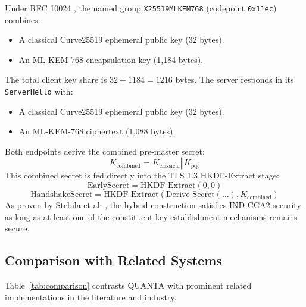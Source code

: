 \documentclass[conference]{IEEEtran}
\begin{document}
Under RFC 10024 \cite{rfc10024}, the named group \texttt{X25519MLKEM768} (codepoint \texttt{0x11ec}) combines:
\begin{itemize}
    \item A classical Curve25519 ephemeral public key (32 bytes).
    \item An ML-KEM-768 encapsulation key (1,184 bytes).
\end{itemize}
The total client key share is $32 + 1184 = 1216$ bytes. The server responds in its \texttt{ServerHello} with:
\begin{itemize}
    \item A classical Curve25519 ephemeral public key (32 bytes).
    \item An ML-KEM-768 ciphertext (1,088 bytes).
\end{itemize}
Both endpoints derive the combined pre-master secret:
\begin{equation}
    K_{\text{combined}} = K_{\text{classical}} \mathbin{\Vert} K_{\text{pqc}}
\end{equation}
This combined secret is fed directly into the TLS 1.3 HKDF-Extract stage:
\begin{equation}
    \text{EarlySecret} = \text{HKDF-Extract}(0, 0)
\end{equation}
\begin{equation}
    \text{HandshakeSecret} = \text{HKDF-Extract}(\text{Derive-Secret}(\dots), K_{\text{combined}})
\end{equation}
As proven by Stebila et al. \cite{rfc9954}, the hybrid construction satisfies IND-CCA2 security as long as at least one of the constituent key establishment mechanisms remains secure.

\subsection{Comparison with Related Systems}
Table~\ref{tab:comparison} contrasts QUANTA with prominent related implementations in the literature and industry.
\end{document}
